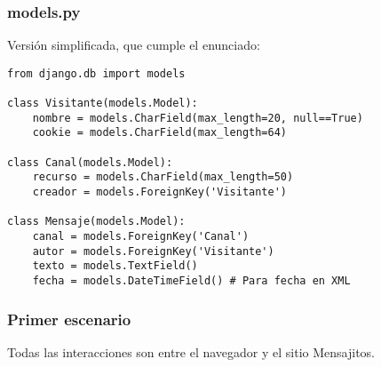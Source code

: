 \subsubsection*{models.py}

Versión simplificada, que cumple el enunciado:

\begin{verbatim}
from django.db import models

class Visitante(models.Model):
    nombre = models.CharField(max_length=20, null==True)
    cookie = models.CharField(max_length=64)

class Canal(models.Model):
    recurso = models.CharField(max_length=50)
    creador = models.ForeignKey('Visitante')

class Mensaje(models.Model):
    canal = models.ForeignKey('Canal')
    autor = models.ForeignKey('Visitante')
    texto = models.TextField()
    fecha = models.DateTimeField() # Para fecha en XML
\end{verbatim}


\subsubsection*{Primer escenario}

Todas las interacciones son entre el navegador y el sitio Mensajitos.


